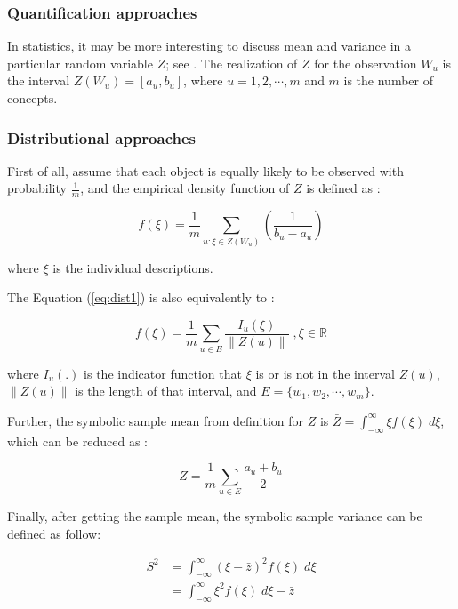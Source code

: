 \documentclass[article]{jss}
\begin{document}
\subsubsection{Quantification approaches}
In statistics, it may be more interesting to discuss mean and variance
in a particular random variable $Z$; see \cite{bertrand:2000}. The
realization of $Z$ for the observation $W_u$ is the interval $Z(W_u) =
[a_u,b_u]$, where $u=1,2,\cdots,m$ and $m$ is the number of concepts.




\subsubsection{Distributional approaches}
First of all, assume that each object is equally likely to be observed with probability $\frac{1}{m}$, and the empirical density function of $Z$ is defined as : 

\begin{equation}\label{eq:dist1}
f(\xi) = \frac{1}{m} \sum_{u:\xi \in Z(W_u)}(\frac{1}{b_u-a_u})
\end{equation}

where $\xi$ is the individual descriptions.


The Equation (\ref{eq:dist1}) is also equivalently to :

\begin{equation}\label{eq:dist2}
f(\xi) = \frac{1}{m}\sum_{u \in E}\frac{I_u(\xi)}{\| Z(u) \|}\;,\xi \in \mathbb{R}
\end{equation}

where $I_u(.)$ is the indicator function that $\xi$ is or is not in the interval $Z(u)$, $\| Z(u) \|$ is the length of that interval, and $E=\{w_1,w_2,\cdots,w_m \}$.

Further, the symbolic sample mean from definition for $Z$ is $\bar{Z} = \int_{-\infty}^{\infty} \xi f(\xi)\;d\xi$, which can be reduced as :

\begin{equation}\label{eq:mean}
\bar{Z}=\frac{1}{m}\sum_{u \in E}\frac{a_u+b_u}{2}
\end{equation}

Finally, after getting the sample mean, the symbolic sample variance can be defined as follow:

\begin{equation}\label{eq:varDef}
\begin{split}
S^2 & = \int_{-\infty}^{\infty} (\xi - \bar{z})^2f(\xi)\;d\xi \\
 & = \int_{-\infty}^{\infty} \xi^2f(\xi)\;d\xi-\bar{z}
\end{split}
\end{equation}
\end{document}
